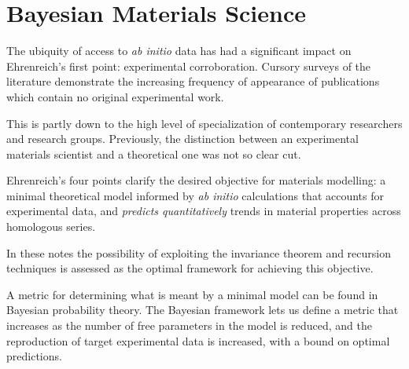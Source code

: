 
\section{Bayesian Materials Science}
The ubiquity of access to {\it ab initio} data has had a significant impact on 
Ehrenreich's first point: experimental corroboration. 
Cursory surveys of the literature demonstrate the increasing frequency of 
appearance of publications which contain no original experimental work. 

This is partly down to the high level of specialization of contemporary 
researchers and research groups. Previously, the distinction between
an experimental materials scientist and a theoretical one was not so clear cut. 

Ehrenreich's four points clarify the desired objective for materials modelling:
a minimal theoretical model informed by {\it ab initio} calculations that accounts for 
experimental data, and {\it predicts quantitatively} trends in material properties
across homologous series. 

In these notes the possibility of exploiting the invariance theorem 
and recursion techniques is assessed as the optimal framework
for achieving this objective. 

A metric for determining what is meant by a minimal model
can be found in Bayesian probability theory. The Bayesian framework 
lets us define a metric that increases as the number of free 
parameters in the model is reduced, and the reproduction of 
target experimental data is increased, with a bound on optimal predictions.

